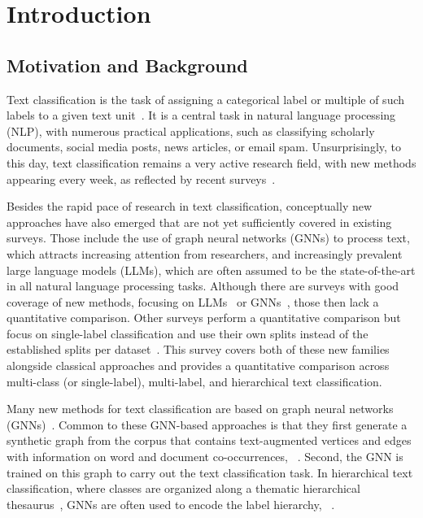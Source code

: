 \documentclass[lettersize,journal]{IEEEtran}
\begin{document}
\section{Introduction}
\subsection{Motivation and Background}

Text classification is the task of assigning a categorical label or multiple of such labels to a given text unit~\cite{DBLP:journals/csur/Sebastiani02,DBLP:journals/tkde/MoreoES20}. 
It is a central task in natural language processing (NLP), with numerous practical applications, such as classifying scholarly documents, social media posts, news articles, or email spam.
Unsurprisingly, to this day, text classification remains a very active research field, with new methods appearing every week, as reflected by recent surveys~\cite{
DBLP:journals/tkde/HuLZHNL24,
fieldsSurveyTextClassification2024,
electronics13071199,
DBLP:journals/tist/LiPLXYSYH22,
DBLP:journals/csur/MinaeeKCNCG21,
DBLP:journals/corr/abs-2107-03158,
DBLP:journals/wias/ZhouGLVTBBK20, 
DBLP:journals/information/KowsariMHMBB19,
DBLP:journals/air/Kadhim19}. 

Besides the rapid pace of research in text classification, conceptually new approaches have also emerged that are not yet sufficiently covered in existing surveys. Those include the use of graph neural networks (GNNs) to process text, which attracts increasing attention from researchers, and increasingly prevalent large language models (LLMs), which are often assumed to be the state-of-the-art in all natural language processing tasks. 
Although there are surveys with good coverage of new methods, \eg focusing on LLMs~\cite{DBLP:journals/tkde/HuLZHNL24} or GNNs~\cite{gnns-for-nlp-survey}, those then lack a quantitative comparison. 
Other surveys perform a quantitative comparison but focus on single-label classification and use their own splits instead of the established splits per dataset~\cite{DBLP:journals/eswa/ReusensSTSVBB24}.
This survey covers both of these new families alongside classical approaches and provides a quantitative comparison across multi-class (or single-label), multi-label, and hierarchical text classification.

Many new methods for text classification are based on graph neural networks (GNNs)~\cite{book:hamilton:grl}.
Common to these GNN-based approaches is that they first generate a synthetic graph from the corpus that contains text-augmented vertices and edges with information on word and document co-occurrences, \eg~\cite{DBLP:conf/aaai/YaoM019,texting_acl2020}. 
Second, the GNN is trained on this graph to carry out the text classification task.
In hierarchical text classification, where classes are organized along a thematic hierarchical thesaurus~\cite{DBLP:journals/csur/Sebastiani02}, GNNs are often used to encode the label hierarchy, \eg~\cite{hbgl,DBLP:conf/acl/WangWH0W22}.
\end{document}
